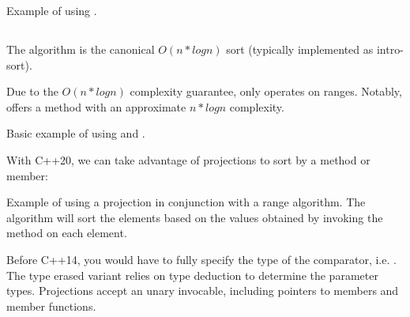\begin{box-note}
\footnotesize Example of using .
\tcblower
{}
\end{box-note}

\subsection{\texorpdfstring{}{\texttt{std::sort}}}

The  algorithm is the canonical $O(n*logn)$ sort (typically implemented as intro-sort).


Due to the $O(n*logn)$ complexity guarantee,  only operates on  ranges. Notably,  offers a method with an approximate $n*logn$ complexity.

\begin{box-note}
\footnotesize Basic example of using  and .
\tcblower
{}
\end{box-note}

With C++20, we can take advantage of projections to sort by a method or member:

\begin{box-note}
\footnotesize Example of using a projection in conjunction with a range algorithm. The algorithm will sort the elements based on the values obtained by invoking the method  on each element.
\tcblower
{}
\end{box-note}

Before C++14, you would have to fully specify the type of the comparator, i.e. . The type erased variant  relies on type deduction to determine the parameter types. Projections accept an unary invocable, including pointers to members and member functions.

\subsection{\texorpdfstring{}{\texttt{std::stable\_sort}}}

